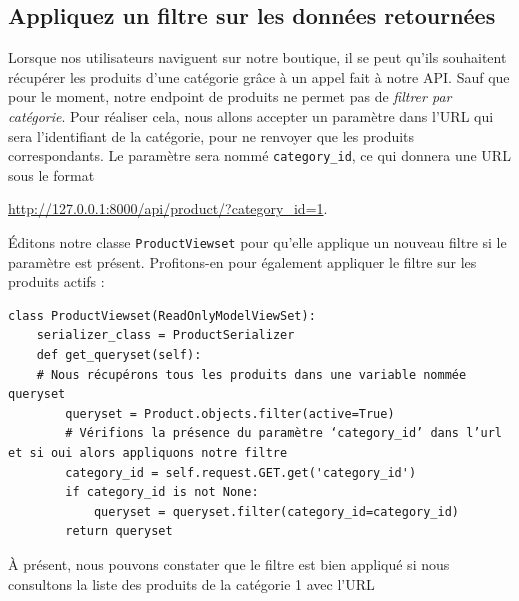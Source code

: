 \documentclass[a4paper]{article}
\begin{document}
\subsection{Appliquez un filtre sur les données retournées}
Lorsque nos utilisateurs naviguent sur notre boutique, il se peut qu’ils souhaitent récupérer les produits d’une catégorie grâce à un appel fait à notre API. Sauf que pour le moment, notre endpoint de produits ne permet pas de {\em filtrer par catégorie}. Pour réaliser cela, nous allons accepter un paramètre dans l’URL qui sera l’identifiant de la catégorie, pour ne renvoyer que les produits correspondants. Le paramètre sera nommé {\tt category\_id}, ce qui donnera une URL sous le format
\begin{center}
\url{http://127.0.0.1:8000/api/product/?category_id=1}.
\end{center}
Éditons notre classe {\tt ProductViewset}  pour qu’elle applique un nouveau filtre si le paramètre est présent. Profitons-en pour également appliquer le filtre sur les produits actifs :
\begin{verbatim}
class ProductViewset(ReadOnlyModelViewSet):
    serializer_class = ProductSerializer
    def get_queryset(self):
    # Nous récupérons tous les produits dans une variable nommée queryset
        queryset = Product.objects.filter(active=True)
        # Vérifions la présence du paramètre ‘category_id’ dans l’url et si oui alors appliquons notre filtre
        category_id = self.request.GET.get('category_id')
        if category_id is not None:
            queryset = queryset.filter(category_id=category_id)
        return queryset
\end{verbatim}

À présent, nous pouvons constater que le filtre est bien appliqué si nous consultons la liste des produits de la catégorie 1 avec l’URL 
\end{document}
